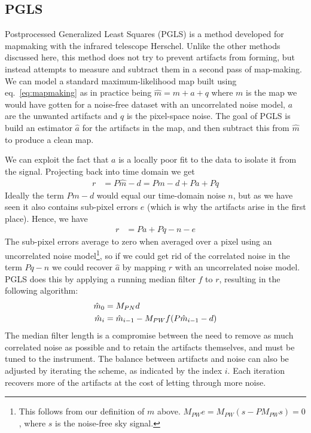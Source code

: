 \documentclass{article}
\begin{document}
\subsection{PGLS}
Postprocessed Generalized Least Squares (PGLS) is a method developed for mapmaking with
the infrared telescope Herschel. Unlike the other methods discussed here, this method
does not try to prevent artifacts from forming, but instead attempts to measure and subtract
them in a second pass of map-making. We can model a standard maximum-likelihood map built
using eq.~\ref{eq:mapmaking} as in practice being $\hat m = m + a + q$ where $m$ is the
map we would have gotten for a noise-free dataset with an uncorrelated noise model,
$a$ are the unwanted artifacts and $q$ is the pixel-space noise.
The goal of PGLS is build an estimator $\hat a$ for the artifacts in the map, and then subtract
this from $\hat m$ to produce a clean map.

We can exploit the fact that $a$ is a locally poor fit to the data to isolate it from the signal.
Projecting back into time domain we get 
\begin{align}
	r &= P\hat m - d = Pm - d + Pa + Pq
\end{align}
Ideally the term $Pm-d$ would equal our time-domain noise $n$, but as we have seen it
also contains sub-pixel errors $e$ (which is why the artifacts arise in the first place).
Hence, we have
\begin{align}
	r &= Pa + Pq - n - e
\end{align}
The sub-pixel errors average to zero when averaged over a pixel using an uncorrelated noise model\footnote{
	This follows from our definition of $m$ above. $M_{PW}e = M_{PW}(s - PM_{PW}s) = 0$, where $s$ is the noise-free sky signal.}, so if we could get rid of the
correlated noise in the term $Pq-n$ we could recover $\hat a$ by mapping $r$ with an uncorrelated
noise model. PGLS does this by applying a running median filter $f$ to $r$, resulting in the following
algorithm:
\begin{align}
	\hat m_0 &= M_{PN} d \notag \\
	\hat m_i &= \hat m_{i-1} - M_{PW} f(P\hat m_{i-1} - d)
\end{align}
The median filter length is a compromise between the need to remove as much correlated noise as
possible and to retain the artifacts themselves, and must be tuned to the instrument. The balance
between artifacts and noise can also be adjusted by iterating the scheme, as indicated by the
index $i$. Each iteration recovers more of the artifacts at the cost of letting through more noise.
\end{document}
